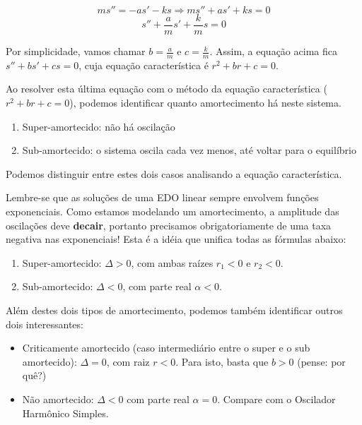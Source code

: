 \documentclass[a4paper]{article}
\begin{document}
\begin{displaymath}
  ms'' = -as' -ks \Rightarrow   ms'' +as' + ks =0
\end{displaymath}
\begin{displaymath}
  s'' +\frac{a}{m}s' + \frac{k}{m}s  =0
\end{displaymath}

Por simplicidade, vamos chamar $b=\frac{a}{m}$ e
$c=\frac{k}{m}$. Assim, a equação acima fica $s''+bs'+cs=0$, cuja
equação característica é $r^2+br+c=0$.

Ao resolver esta última equação com o método da equação característica
($r^2+br+c=0$), podemos identificar quanto amortecimento há neste sistema.

\begin{enumerate}
\item Super-amortecido: não há oscilação
\item Sub-amortecido: o sistema oscila cada vez menos, até voltar para
  o equilíbrio
\end{enumerate}

Podemos distinguir entre estes dois casos analisando a equação
característica.

Lembre-se que as soluções de uma EDO linear sempre envolvem funções
exponenciais. Como estamos modelando um amortecimento, a amplitude das
oscilações deve {\bf decair}, portanto precisamos obrigatoriamente de
uma taxa negativa nas exponenciais! Esta é a idéia que unifica todas
as fórmulas abaixo:

\begin{enumerate}
\item Super-amortecido: $\Delta>0$, com ambas raízes $r_1<0$ e
  $r_2<0$.
\item Sub-amortecido: $\Delta<0$, com parte real $\alpha<0$.
\end{enumerate}

Além destes dois tipos de amortecimento, podemos também identificar
outros dois interessantes:

\begin{itemize}
\item Criticamente amortecido (caso intermediário entre o super e o
  sub amortecido): $\Delta=0$, com raiz $r<0$. Para isto, basta que
  $b>0$ (pense: por quê?)
\item Não amortecido: $\Delta<0$ com parte real $\alpha=0$. Compare
  com o Oscilador Harmônico Simples.
\end{itemize}
\end{document}

